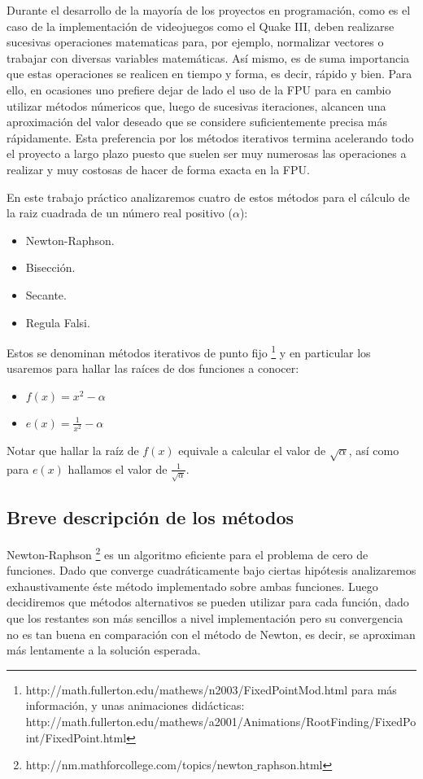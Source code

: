 Durante el desarrollo de la mayoría de los proyectos en programación, como es el caso de la implementación de videojuegos como el Quake III, deben realizarse sucesivas operaciones matematicas para, por ejemplo, normalizar vectores o trabajar con diversas variables matemáticas. Así mismo, es de 
suma importancia que estas operaciones se realicen en tiempo y forma, es decir, rápido y bien. Para ello, en ocasiones uno prefiere dejar de lado el uso de la FPU para en cambio utilizar métodos númericos que, luego de sucesivas iteraciones, alcancen una aproximación del valor deseado que se considere suficientemente precisa más rápidamente. Esta preferencia por los métodos iterativos termina acelerando todo el proyecto a largo plazo puesto que suelen ser muy numerosas las operaciones a realizar y muy costosas de hacer de forma exacta en la FPU.

En este trabajo práctico analizaremos cuatro de estos métodos para el cálculo de la raiz cuadrada de un número real positivo ($\alpha$): 
\begin{itemize}
	\item Newton-Raphson.
	\item Bisección.
	\item Secante.
	\item Regula Falsi.
\end{itemize}

Estos se denominan métodos iterativos de punto fijo \footnote{http://math.fullerton.edu/mathews/n2003/FixedPointMod.html para más información, y unas animaciones didácticas: http://math.fullerton.edu/mathews/a2001/Animations/RootFinding/FixedPoint/FixedPoint.html} y en particular los usaremos para hallar las raíces de dos funciones a conocer:

\begin{itemize}
	\item $f(x) = x^2 - \alpha$
	\item $\displaystyle e(x) = \frac{1}{x^2} - \alpha$
\end{itemize}

Notar que hallar la raíz de $f(x)$ equivale a calcular el valor de $\sqrt{\alpha}$, así como para $e(x)$ hallamos el valor de $\displaystyle 
\frac{1}{\sqrt{\alpha}}$.

\subsection{Breve descripción de los métodos}

Newton-Raphson \footnote{http://nm.mathforcollege.com/topics/newton$\_$raphson.html} es un algoritmo eficiente para el problema de cero de funciones. Dado que converge cuadráticamente bajo ciertas hipótesis analizaremos exhaustivamente éste método implementado sobre ambas funciones. Luego decidiremos que métodos alternativos se pueden utilizar para cada función, dado que los restantes son más sencillos a nivel implementación pero su convergencia no es tan buena en comparación con el método de Newton, es decir, se aproximan más lentamente a la solución esperada.

